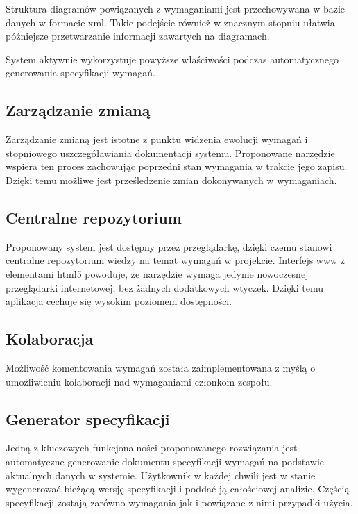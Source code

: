       Struktura diagramów powiązanych z wymaganiami jest przechowywana w bazie danych w formacie xml. Takie podejście również w znacznym stopniu ułatwia późniejsze przetwarzanie informacji zawartych na diagramach. 
      
      System aktywnie wykorzystuje powyższe właściwości podczas automatycznego generowania specyfikacji wymagań.

    \subsection{Zarządzanie zmianą}
      Zarządzanie zmianą jest istotne z punktu widzenia ewolucji wymagań i stopniowego uszczegóławiania dokumentacji systemu. Proponowane narzędzie wspiera ten proces zachowując poprzedni stan wymagania w trakcie jego zapisu. Dzięki temu możliwe jest prześledzenie zmian dokonywanych w wymaganiach. 

    \subsection{Centralne repozytorium}
      Proponowany system jest dostępny przez przeglądarkę, dzięki czemu stanowi centralne repozytorium wiedzy na temat wymagań w projekcie. Interfejs www z elementami html5 powoduje, że narzędzie wymaga jedynie nowoczesnej przeglądarki internetowej, bez żadnych dodatkowych wtyczek. Dzięki temu aplikacja cechuje się wysokim poziomem dostępności.  

    \subsection{Kolaboracja}
      Możliwość komentowania wymagań została zaimplementowana z myślą o umożliwieniu kolaboracji nad wymaganiami członkom zespołu.

    \subsection{Generator specyfikacji}
      Jedną z kluczowych funkcjonalności proponowanego rozwiązania jest automatyczne generowanie dokumentu specyfikacji wymagań na podstawie aktualnych danych w systemie.
      Użytkownik w każdej chwili jest w stanie wygenerować bieżącą wersję specyfikacji i poddać ją całościowej analizie. Częścią specyfikacji zostają zarówno wymagania jak i powiązane z nimi przypadki użycia.

